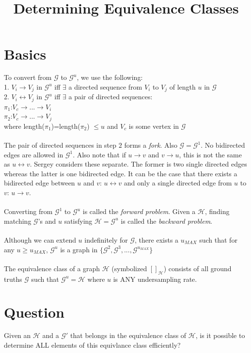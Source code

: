 \documentclass{article}
\theoremstyle{definition}
\begin{document}
\title{Determining Equivalence Classes}
\maketitle

\section{Basics}

To convert from $\mathcal{G}$ to $\mathcal{G}^u$, we use the following:
\\
1. $V_i \rightarrow V_j$ in $\mathcal{G}^u$ iff $\exists$ a directed sequence from $V_i$ to $V_j$ of length $u$ in $\mathcal{G}$
\\
2. $V_i \leftrightarrow V_j$ in $\mathcal{G}^u$ iff $\exists$ a pair of directed sequences:
\\
$ \pi_1$:$ V_c \rightarrow ... \rightarrow V_i$
\\
$ \pi_2$:$ V_c \rightarrow ... \rightarrow V_j$
\\
where length($\pi_1$)=length($\pi_2$) $\leq u$ and $V_c$ is some vertex in $\mathcal{G}$ 
\\
\\
The pair of directed sequences in step $2$ forms a \textit{fork}. Also $\mathcal{G}= \mathcal{G}^1$. No bidirected edges are allowed in $\mathcal{G}^1$. Also note that if $u \rightarrow v$ and $v \rightarrow u$, this is not the same as $u \leftrightarrow v$. Sergey considers these separate. The former is two single directed edges whereas the latter is one bidirected edge. It can be the case that there exists a bidirected edge between $u$ and $v$: $u \leftrightarrow v$ and only a single directed edge from $u$ to $v$: $u \rightarrow v$.
\\
\\
Converting from $\mathcal{G}^1$ to $\mathcal{G}^u$ is called the \textit{forward problem}. Given a $\mathcal{H}$, finding matching $\mathcal{G}$'s and $u$ satisfying $\mathcal{H} = \mathcal{G}^u$ is called the \textit{backward problem}. 
\\
\\
Although we can extend $u$ indefinitely for $\mathcal{G}$, there exists a $u_{MAX}$ such that for any $u \geq u_{MAX}$, $\mathcal{G}^{u}$ is a graph in $\{\mathcal{G}^2,\mathcal{G}^3,...,\mathcal{G}^{u_{MAX}}\}$
\\
\\
The equivalence class of a graph $\mathcal{H}$ (symbolized $[]_{\mathcal{H}}$) consists of all ground truths $\mathcal{G}$ such that $\mathcal{G}^u = \mathcal{H}$ where $u$ is ANY undersampling rate.

\newpage

\section{Question}

Given an $\mathcal{H}$ and a $\mathcal{G'}$ that belongs in the equivalence class of $\mathcal{H}$, is it possible to determine ALL elements of this equivlance class efficiently?





	


\end{document}
